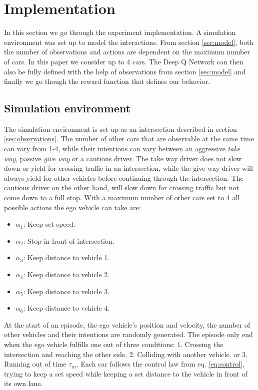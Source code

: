 \section{Implementation}
\label{sec:implementation}
In this section we go through the experiment implementation. A simulation environment was set up to model the interactions. From section \ref{sec:model}, both the number of observations and actions are dependent on the maximum number of cars. In this paper we consider up to 4 cars. The Deep Q Network can then also be fully defined with the help of observations from section \ref{sec:model} and finally we go though the reward function that defines our behavior. 

\subsection{Simulation environment}
\label{sec:simulation}
The simulation environment is set up as an intersection described in section \ref{sec:observations}. The number of other cars that are observable at the same time can vary from 1-4, while their intentions can vary between an aggressive {\em take way}, passive {\em give way} or a cautious driver. The take way driver does not slow down or yield for crossing traffic in an intersection, while the give way driver will always yield for other vehicles before continuing through the intersection. The cautious driver on the other hand, will slow down for crossing traffic but not come down to a full stop. With a maximum number of other cars set to 4 all possible actions the ego vehicle can take are:

\vspace{0.2cm}
\begin{itemize}
	\item $\alpha_1$: Keep set speed.
	\item $\alpha_2$: Stop in front of intersection.
	\item $\alpha_3$: Keep distance to vehicle 1.
	\item $\alpha_4$: Keep distance to vehicle 2.
	\item $\alpha_5$: Keep distance to vehicle 3.
	\item $\alpha_6$: Keep distance to vehicle 4.
\end{itemize}
\vspace{0.2cm}

At the start of an episode, the ego vehicle's position and velocity, the number of other vehicles and their intentions are randomly generated. The episode only end when the ego vehicle fulfills one out of  three conditions: 1. Crossing the intersection and reaching the other side, 2. Colliding with another vehicle. or 3. Running out of time $\tau_m$. Each car follows the control law from eq. \ref{eq:control}, trying to keep a set speed while keeping a set distance to the vehicle in front of its own lane. 

